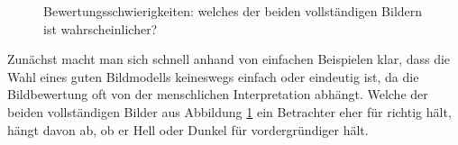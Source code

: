 \documentclass{mythesis}
\begin{document}
\begin{figure}[ht]
    \begin{subfigure}[b]{0.33\textwidth}
	\centering
    \end{subfigure}%
    \begin{subfigure}[b]{0.33\textwidth}
	\centering
    \end{subfigure}%
    \begin{subfigure}[b]{0.33\textwidth}
	\centering
    \end{subfigure}
    \caption{Bewertungsschwierigkeiten: welches der beiden vollständigen Bildern ist wahrscheinlicher?}
    \label{fig:inpainting_non_unique}
\end{figure}

Zunächst macht man sich schnell anhand von einfachen Beispielen klar, dass die Wahl eines guten Bildmodells keineswegs einfach oder eindeutig ist, da die Bildbewertung oft von der menschlichen Interpretation abhängt.
Welche der beiden vollständigen Bilder aus Abbildung \ref{fig:inpainting_non_unique} ein Betrachter eher für richtig hält, hängt davon ab, ob er Hell oder Dunkel für vordergründiger hält.
\end{document}
